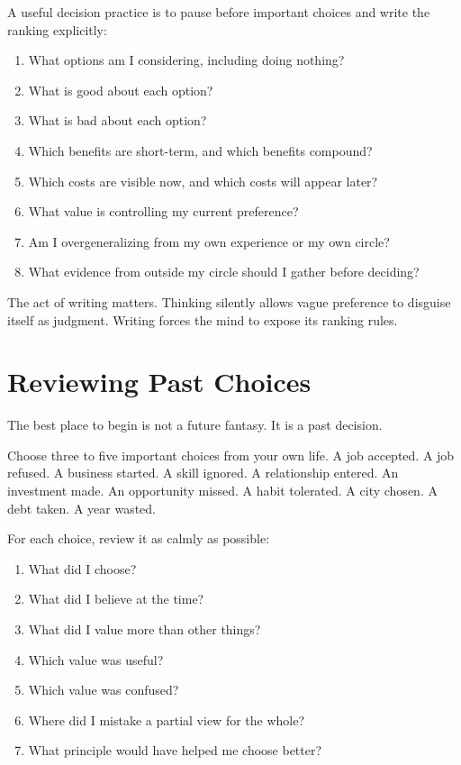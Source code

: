 A useful decision practice is to pause before important choices and write the ranking explicitly:

\begin{enumerate}
\item What options am I considering, including doing nothing?
\item What is good about each option?
\item What is bad about each option?
\item Which benefits are short-term, and which benefits compound?
\item Which costs are visible now, and which costs will appear later?
\item What value is controlling my current preference?
\item Am I overgeneralizing from my own experience or my own circle?
\item What evidence from outside my circle should I gather before deciding?
\end{enumerate}

The act of writing matters. Thinking silently allows vague preference to disguise itself as judgment. Writing forces the mind to expose its ranking rules.

\section*{Reviewing Past Choices}

The best place to begin is not a future fantasy. It is a past decision.

Choose three to five important choices from your own life. A job accepted. A job refused. A business started. A skill ignored. A relationship entered. An investment made. An opportunity missed. A habit tolerated. A city chosen. A debt taken. A year wasted.

For each choice, review it as calmly as possible:

\begin{enumerate}
\item What did I choose?
\item What did I believe at the time?
\item What did I value more than other things?
\item Which value was useful?
\item Which value was confused?
\item Where did I mistake a partial view for the whole?
\item What principle would have helped me choose better?
\end{enumerate}

